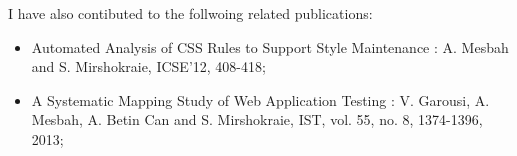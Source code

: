 I have also contibuted to the follwoing related publications:
\begin{itemize} [noitemsep, nolistsep]
\item Automated Analysis of CSS Rules to Support Style Maintenance \cite{mesbah:icse12}: 
A. Mesbah and S. Mirshokraie, ICSE'12, 408-418;
\item A Systematic Mapping Study of Web Application Testing \cite{garousi:ist13}: 
V. Garousi, A. Mesbah, A. Betin Can and S. Mirshokraie, IST, vol. 55, no. 8, 1374-1396, 2013;
\end{itemize}
